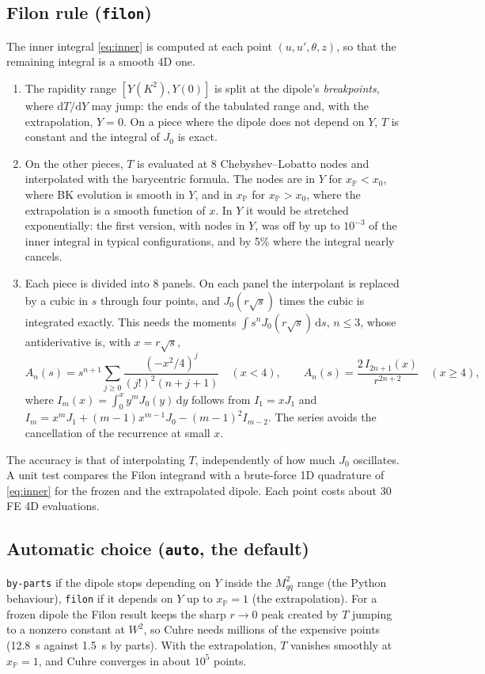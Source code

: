 \documentclass[11pt,a4paper]{article}
\newcommand{\Mqq}{M_{q\bar q}^2}
\newcommand{\dd}{\mathrm{d}}
\newcommand{\xP}{x_{\mathbb{P}}}
\newcommand{\code}[1]{\texttt{#1}}
\begin{document}
\subsection{Filon rule (\code{filon})}
The inner integral \eqref{eq:inner} is computed at each point
$(u, u', \theta, z)$, so that the remaining integral is a smooth 4D one.
\begin{enumerate}
  \item The rapidity range $[Y(K^2), Y(0)]$ is split at the dipole's
    \emph{breakpoints}, where $\dd T/\dd Y$ may jump: the ends of the tabulated
    range and, with the extrapolation, $Y = 0$. On a piece where the dipole does
    not depend on $Y$, $T$ is constant and the integral of $J_0$ is exact.
  \item On the other pieces, $T$ is evaluated at 8 Chebyshev--Lobatto nodes and
    interpolated with the barycentric formula. The nodes are in $Y$ for
    $\xP < x_0$, where BK evolution is smooth in $Y$, and in $\xP$ for
    $\xP > x_0$, where the extrapolation is a smooth function of $x$. In $Y$ it
    would be stretched exponentially: the first version, with nodes in $Y$, was
    off by up to $10^{-3}$ of the inner integral in typical configurations, and
    by 5\% where the integral nearly cancels.
  \item Each piece is divided into 8 panels. On each panel the interpolant is
    replaced by a cubic in $s$ through four points, and $J_0(r\sqrt{s})$ times
    the cubic is integrated exactly. This needs the moments
    $\int s^n J_0(r\sqrt{s})\,\dd s$, $n \le 3$, whose antiderivative is, with
    $x = r\sqrt{s}$,
    \begin{equation}
      A_n(s) = s^{n+1} \sum_{j\ge0} \frac{(-x^2/4)^j}{(j!)^2 (n+j+1)}
      \quad (x < 4), \qquad
      A_n(s) = \frac{2\, I_{2n+1}(x)}{r^{2n+2}} \quad (x \ge 4),
    \end{equation}
    where $I_m(x) = \int_0^x y^m J_0(y)\,\dd y$ follows from $I_1 = xJ_1$ and
    $I_m = x^m J_1 + (m-1)x^{m-1}J_0 - (m-1)^2 I_{m-2}$. The series avoids the
    cancellation of the recurrence at small $x$.
\end{enumerate}
The accuracy is that of interpolating $T$, independently of how much $J_0$
oscillates. A unit test compares the Filon integrand with a brute-force 1D
quadrature of \eqref{eq:inner} for the frozen and the extrapolated dipole.
Each point costs about 30 FE 4D evaluations.

\subsection{Automatic choice (\code{auto}, the default)}
\code{by-parts} if the dipole stops depending on $Y$ inside the $\Mqq$ range
(the Python behaviour), \code{filon} if it depends on $Y$ up to $\xP = 1$ (the
extrapolation). For a frozen dipole the Filon result keeps the sharp
$r \to 0$ peak created by $T$ jumping to a nonzero constant at $W^2$, so Cuhre
needs millions of the expensive points (12.8~s against 1.5~s by parts). With
the extrapolation, $T$ vanishes smoothly at $\xP = 1$, and Cuhre converges in
about $10^5$ points.
\end{document}
